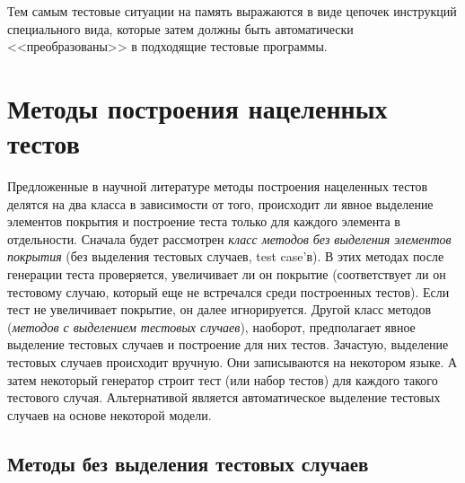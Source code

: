 Тем самым тестовые ситуации на память выражаются в виде цепочек инструкций специального вида, которые затем должны быть автоматически <<преобразованы>> в подходящие тестовые программы.

\section{Методы построения нацеленных тестов}


Предложенные в научной литературе методы построения нацеленных тестов делятся на два класса в зависимости от того, происходит ли явное выделение элементов покрытия и построение теста только для каждого элемента в отдельности. Сначала будет рассмотрен \emph{класс методов без выделения элементов покрытия} (без выделения тестовых случаев, test case'в). В этих методах после генерации теста проверяется, увеличивает ли он покрытие (соответствует ли он тестовому случаю, который еще не встречался среди построенных тестов). Если тест не увеличивает покрытие, он далее игнорируется. Другой класс методов (\emph{методов с выделением тестовых случаев}), наоборот, предполагает явное выделение тестовых случаев и построение для них тестов. Зачастую, выделение тестовых случаев происходит вручную. Они записываются на некотором языке. А затем некоторый генератор строит тест (или набор тестов) для каждого такого тестового случая. Альтернативой является автоматическое выделение тестовых случаев на основе некоторой модели.

\subsection{Методы без выделения тестовых случаев}

